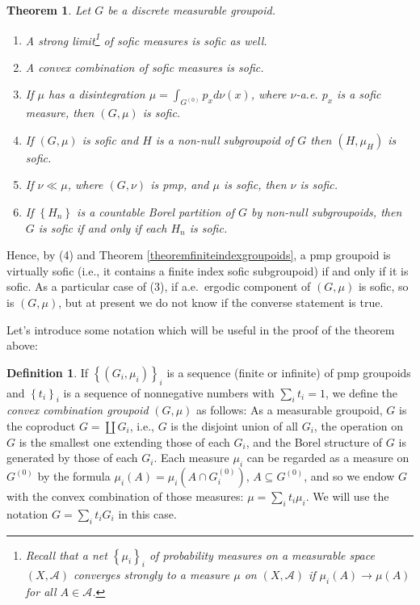 \documentclass[11pt]{amsart}
\theoremstyle{plain}    \newtheorem{theorem}[generalnumbering]{Theorem}
\theoremstyle{plain}    \newtheorem{corollary}[generalnumbering]{Corollary}
\theoremstyle{definition}   \newtheorem{definition}[generalnumbering]{Definition}
\theoremstyle{definition}   \newtheorem{example}[generalnumbering]{Example}
\theoremstyle{plain}    \newtheorem{proposition}[generalnumbering]{Proposition}
\theoremstyle{plain}    \newtheorem{lemma}[generalnumbering]{Lemma}
\theoremstyle{plain}    \newtheorem{plainstyle}[generalnumbering]{\namefordifferentenvironment}
\theoremstyle{plain}    \newtheorem*{plainstyle*}{\namefordifferentenvironment}
\theoremstyle{definition}    \newtheorem{definitionstyle}[generalnumbering]{\namefordifferentenvironment}
\theoremstyle{definition}    \newtheorem*{definitionstyle*}{\namefordifferentenvironment}
\begin{document}
\begin{theorem}\label{theorempermanence}
Let $G$ be a discrete measurable groupoid.
\begin{enumerate}
\item A strong limit\footnote{Recall that a net $\left\{\mu_i\right\}_i$ of probability measures on a measurable space $(X,\mathcal{A})$ \emph{converges strongly} to a measure $\mu$ on $(X,\mathcal{A})$ if $\mu_i(A)\to\mu(A)$ for all $A\in\mathcal{A}$.} of sofic measures is sofic as well.
\item A convex combination of sofic measures is sofic.
\item If $\mu$ has a disintegration $\mu=\int_{G^{(0)}} p_xd\nu(x)$, where $\nu$-a.e. $p_x$ is a sofic measure, then $(G,\mu)$ is sofic.
\item\label{theorempermanenceitemsubgroupoid} If $(G,\mu)$ is sofic and $H$ is a non-null subgroupoid of $G$ then $(H,\mu_H)$ is sofic.
\item If $\nu\ll\mu$, where $(G,\nu)$ is pmp, and $\mu$ is sofic, then $\nu$ is sofic.
\item If $\left\{H_n\right\}$ is a countable Borel partition of $G$ by non-null subgroupoids, then $G$ is sofic if and only if each $H_n$ is sofic.
\end{enumerate}
\end{theorem}
Hence, by (4) and Theorem \ref{theoremfiniteindexgroupoids}, a pmp groupoid is virtually sofic (i.e., it contains a finite index sofic subgroupoid) if and only if it is sofic. As a particular case of (3), if a.e.\ ergodic component of $(G,\mu)$ is sofic, so is $(G,\mu)$, but at present we do not know if the converse statement is true.

Let's introduce some notation which will be useful in the proof of the theorem above:

\begin{definition}
If $\left\{(G_i,\mu_i)\right\}_i$ is a sequence (finite or infinite) of pmp groupoids and $\left\{t_i\right\}_i$ is a sequence of nonnegative numbers with $\sum_i t_i=1$, we define the \emph{convex combination groupoid} $(G,\mu)$ as follows: As a measurable groupoid, $G$ is the coproduct $G=\coprod G_i$, i.e., $G$ is the disjoint union of all $G_i$, the operation on $G$ is the smallest one extending those of each $G_i$, and the Borel structure of $G$ is generated by those of each $G_i$. Each measure $\mu_i$ can be regarded as a measure on $G^{(0)}$ by the formula $\mu_i(A)=\mu_i(A\cap G_i^{(0)})$, $A\subseteq G^{(0)}$, and so we endow $G$ with the convex combination of those measures: $\mu=\sum_i t_i\mu_i$. We will use the notation $G=\sum_i t_iG_i$ in this case.
\end{definition}
\end{document}
